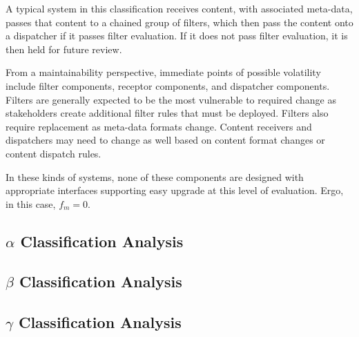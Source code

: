 A typical system in this classification receives content, with associated meta-data, passes that content to a chained group of filters, which then pass the content onto a dispatcher if it passes filter evaluation.  If it does not pass filter evaluation, it is then held for future review.


From a maintainability perspective, immediate points of possible volatility include filter components, receptor components, and dispatcher components.  Filters are generally expected to be the most vulnerable to required change as stakeholders create additional filter rules that must be deployed.  Filters also require replacement as meta-data formats change.  Content receivers and dispatchers may need to change as well based on content format changes or content dispatch rules.

In these kinds of systems, none of these components are designed with appropriate interfaces supporting easy upgrade at this level of evaluation.  Ergo, in this case, $ f_{m} = 0 $.



\subsection{$\alpha$ Classification Analysis}

\subsection{$\beta$ Classification Analysis}

\subsection{$\gamma$ Classification Analysis}